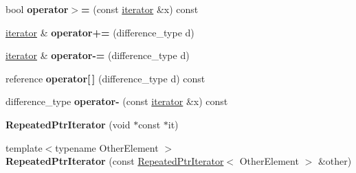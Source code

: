 \begin{DoxyCompactItemize}
bool {\bfseries operator$>$=} (const \hyperlink{classgoogle_1_1protobuf_1_1internal_1_1RepeatedPtrIterator}{iterator} \&x) const
\item 
\mbox{\label{classgoogle_1_1protobuf_1_1internal_1_1RepeatedPtrIterator_a4787b8a9063178623af552a85ef0fd22}} 
\hyperlink{classgoogle_1_1protobuf_1_1internal_1_1RepeatedPtrIterator}{iterator} \& {\bfseries operator+=} (difference\+\_\+type d)
\item 
\mbox{\label{classgoogle_1_1protobuf_1_1internal_1_1RepeatedPtrIterator_a2b93c9a18fed72b129607e010e18b279}} 
\hyperlink{classgoogle_1_1protobuf_1_1internal_1_1RepeatedPtrIterator}{iterator} \& {\bfseries operator-\/=} (difference\+\_\+type d)
\item 
\mbox{\label{classgoogle_1_1protobuf_1_1internal_1_1RepeatedPtrIterator_a67a1bd3b8990e7049c51672b7656c78f}} 
reference {\bfseries operator\mbox{[}$\,$\mbox{]}} (difference\+\_\+type d) const
\item 
\mbox{\label{classgoogle_1_1protobuf_1_1internal_1_1RepeatedPtrIterator_a6ad7dc39f883f5338c40c9f31a1cccc0}} 
difference\+\_\+type {\bfseries operator-\/} (const \hyperlink{classgoogle_1_1protobuf_1_1internal_1_1RepeatedPtrIterator}{iterator} \&x) const
\item 
\mbox{\label{classgoogle_1_1protobuf_1_1internal_1_1RepeatedPtrIterator_aef704a89a0af1bd57898c5d06d035db2}} 
{\bfseries Repeated\+Ptr\+Iterator} (void $\ast$const $\ast$it)
\item 
\mbox{\label{classgoogle_1_1protobuf_1_1internal_1_1RepeatedPtrIterator_adb14d8a077fadccd065046f88b807db5}} 
{\footnotesize template$<$typename Other\+Element $>$ }\\{\bfseries Repeated\+Ptr\+Iterator} (const \hyperlink{classgoogle_1_1protobuf_1_1internal_1_1RepeatedPtrIterator}{Repeated\+Ptr\+Iterator}$<$ Other\+Element $>$ \&other)
\item 
\mbox{\label{classgoogle_1_1protobuf_1_1internal_1_1RepeatedPtrIterator_a2fcbbedbb5c197d48ee65e2e8e176480}} 

\end{DoxyCompactItemize}
